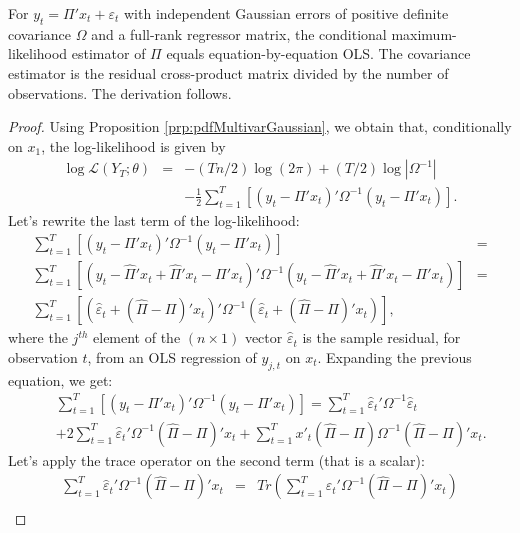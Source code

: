 \documentclass[
  11pt,
]{book}
\theoremstyle{definition}
\theoremstyle{definition}
\theoremstyle{definition}
\theoremstyle{definition}
\theoremstyle{remark}
\begin{document}
For \(y_t=\Pi'x_t+\varepsilon_t\) with independent Gaussian errors of positive definite covariance \(\Omega\) and a full-rank regressor matrix, the conditional maximum-likelihood estimator of \(\Pi\) equals equation-by-equation OLS. The covariance estimator is the residual cross-product matrix divided by the number of observations. The derivation follows.

\begin{proof}
Using Proposition \ref{prp:pdfMultivarGaussian}, we obtain that, conditionally on \(x_1\), the log-likelihood is given by
\begin{eqnarray*}
\log\mathcal{L}(Y_{T};\theta) & = & -(Tn/2)\log(2\pi)+(T/2)\log\left|\Omega^{-1}\right|\\
&  & -\frac{1}{2}\sum_{t=1}^{T}\left[\left(y_{t}-\Pi'x_{t}\right)'\Omega^{-1}\left(y_{t}-\Pi'x_{t}\right)\right].
\end{eqnarray*}
Let's rewrite the last term of the log-likelihood:
\begin{eqnarray*}
\sum_{t=1}^{T}\left[\left(y_{t}-\Pi'x_{t}\right)'\Omega^{-1}\left(y_{t}-\Pi'x_{t}\right)\right] & =\\
\sum_{t=1}^{T}\left[\left(y_{t}-\hat{\Pi}'x_{t}+\hat{\Pi}'x_{t}-\Pi'x_{t}\right)'\Omega^{-1}\left(y_{t}-\hat{\Pi}'x_{t}+\hat{\Pi}'x_{t}-\Pi'x_{t}\right)\right] & =\\
\sum_{t=1}^{T}\left[\left(\hat{\varepsilon}_{t}+(\hat{\Pi}-\Pi)'x_{t}\right)'\Omega^{-1}\left(\hat{\varepsilon}_{t}+(\hat{\Pi}-\Pi)'x_{t}\right)\right],
\end{eqnarray*}
where the \(j^{th}\) element of the \((n\times1)\) vector \(\hat{\varepsilon}_{t}\) is the sample residual, for observation \(t\), from an OLS regression of \(y_{j,t}\) on \(x_{t}\). Expanding the previous equation, we get:
\begin{eqnarray*}
&&\sum_{t=1}^{T}\left[\left(y_{t}-\Pi'x_{t}\right)'\Omega^{-1}\left(y_{t}-\Pi'x_{t}\right)\right]  = \sum_{t=1}^{T}\hat{\varepsilon}_{t}'\Omega^{-1}\hat{\varepsilon}_{t}\\
&&+2\sum_{t=1}^{T}\hat{\varepsilon}_{t}'\Omega^{-1}(\hat{\Pi}-\Pi)'x_{t}+\sum_{t=1}^{T}x'_{t}(\hat{\Pi}-\Pi)\Omega^{-1}(\hat{\Pi}-\Pi)'x_{t}.
\end{eqnarray*}
Let's apply the trace operator on the second term (that is a scalar):
\begin{eqnarray*}
\sum_{t=1}^{T}\hat{\varepsilon}_{t}'\Omega^{-1}(\hat{\Pi}-\Pi)'x_{t} & = & Tr\left(\sum_{t=1}^{T}\hat{\varepsilon}_{t}'\Omega^{-1}(\hat{\Pi}-\Pi)'x_{t}\right)\\

\end{eqnarray*}
\end{proof}
\end{document}
